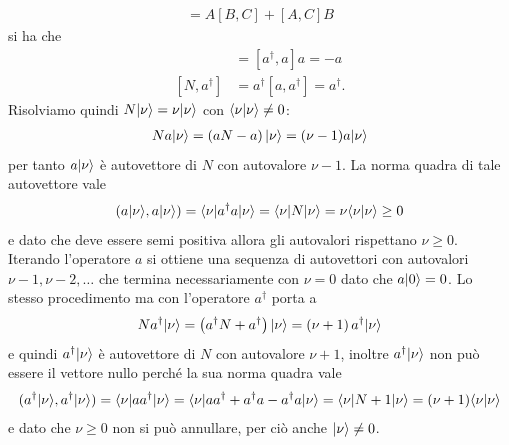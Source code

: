 \begin{align*}
  [AB,C] = A[B,C] + [A,C] B
\end{align*}
si ha che 
\begin{align*}
  [N, a] &= [a^\dag, a] a = - a
  \\
  [N, a^\dag] &= a^\dag [a, a^\dag] = a^\dag.
\end{align*}
Risolviamo quindi $ N\vert \nu \rangle = \nu \vert \nu \rangle $ con $ \langle \nu | \nu \rangle \neq 0 $:
\begin{align*}
  Na\vert \nu \rangle = \left( a N - a \right) \vert \nu \rangle = (\nu - 1) a\vert \nu \rangle
\end{align*}
per tanto $ a\vert \nu \rangle $ è autovettore di $ N $ con autovalore $ \nu - 1 $. La norma quadra di tale autovettore vale 
\begin{align*}
  (a\vert \nu \rangle, a\vert \nu \rangle) = \langle \nu | a^\dag a| \nu \rangle = \langle \nu | N | \nu \rangle = \nu \langle \nu |\nu \rangle \geq 0
\end{align*}
e dato che deve essere semi positiva allora gli autovalori rispettano $ \nu \geq 0 $. Iterando l'operatore $ a $ si ottiene una sequenza di autovettori 
con autovalori $ \nu - 1, \nu - 2, \dots $ che termina necessariamente con $ \nu = 0 $ dato che $ a \vert 0 \rangle = 0 $. Lo stesso procedimento ma con 
l'operatore $ a^\dag $ porta a 
\begin{align*}
  N a^\dag \vert \nu \rangle = \left( a^\dag N + a^\dag \right) \vert \nu \rangle = \left( \nu + 1 \right) a^\dag \vert \nu \rangle
\end{align*}
e quindi $ a^\dag \vert \nu \rangle $ è autovettore di $ N $ con autovalore $ \nu + 1 $, inoltre $ a^\dag\vert \nu \rangle $ non può essere il vettore nullo perché la sua norma 
quadra vale 
\begin{align*}
  (a^\dag \vert \nu \rangle, a^\dag \vert \nu \rangle) = \langle \nu | a a^\dag | \nu \rangle = \langle \nu | aa^\dag + a^\dag a - a^\dag a| \nu  \rangle = \langle \nu | N + 1 | \nu \rangle= (\nu + 1) \langle \nu | \nu \rangle
\end{align*}
e dato che $ \nu \geq 0 $ non si può annullare, per ciò anche $ \vert \nu \rangle \neq 0 $.

